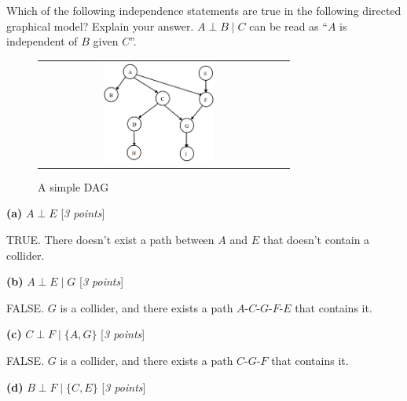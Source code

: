 \documentclass[11pt]{article}
\newcounter{marks}
\def\maxmarks#1{\extramark{#1}\addtocounter{marks}{#1}}
\def\extramark#1{\hfill
  [\emph{#1 points}]
}
\renewcommand{\part}[1] {\vspace{.10in} {\bf (#1)}}
\begin{document}
Which of the following independence statements are true in the following directed graphical model? Explain your answer. $A \perp B \mid C$ can be read as ``$A$ is independent of $B$ given $C$''.

\begin{figure}[h]
\centering
\begin{tabular}{cc}
\includegraphics[width = 0.48\textwidth]{q2.jpg}& 
\end{tabular}
\caption{A simple DAG}\label{fig:GNB}
\end{figure}

\part{a} $A \perp E$ \maxmarks{3}

{\color{blue} TRUE. There doesn't exist a path between $A$ and $E$
that doesn't contain a collider. } \vspace{0 cm}

\part{b} $A \perp E \mid G$ \maxmarks{3}

{\color{blue} FALSE. $G$ is a collider, and there exists a path $A$-$C$-$G$-$F$-$E$ 
that contains it. } \vspace{0 cm}

\part{c} $C \perp F \mid \{A, G\}$ \maxmarks{3} 

{\color{blue} FALSE. $G$ is a collider, and there exists a path $C$-$G$-$F$ that contains it. }
\vspace{0 cm}

\part{d} $B \perp F \mid \{C,E\}$ \maxmarks{3}
\end{document}
